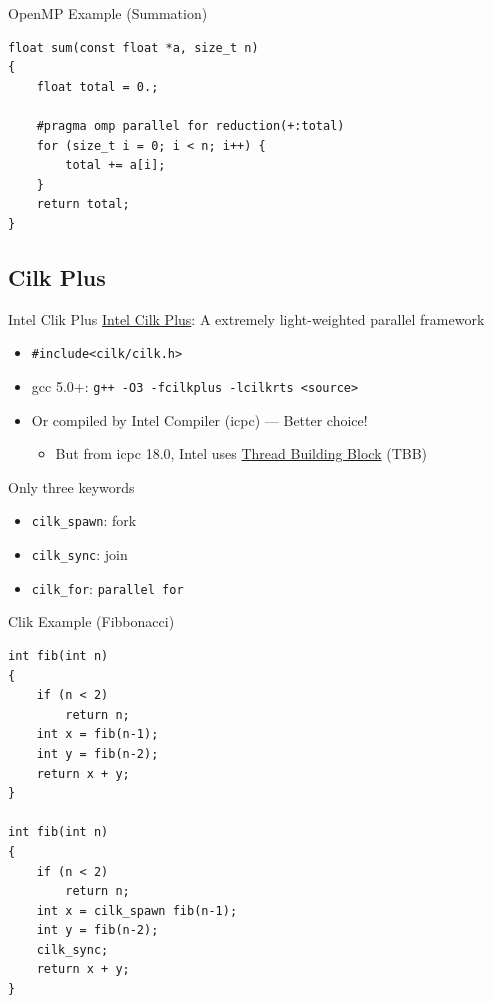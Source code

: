 \documentclass{../TexTemplate/myslide}
\begin{document}
\begin{frame}[fragile]{OpenMP Example (Summation)}
\begin{lstlisting}
float sum(const float *a, size_t n)
{
    float total = 0.;

    #pragma omp parallel for reduction(+:total)
    for (size_t i = 0; i < n; i++) {
        total += a[i];
    }
    return total;
}
\end{lstlisting}
\end{frame}

\subsection{Cilk Plus}
\begin{frame}
\subsectionpage
\end{frame}

\begin{frame}[fragile]{Intel Clik Plus}
\href{https://www.cilkplus.org/}{Intel Cilk Plus}: A extremely light-weighted parallel framework
\begin{itemize}
	\item \verb'#include<cilk/cilk.h>'
	\item gcc 5.0+: \verb'g++ -O3 -fcilkplus -lcilkrts <source>'
	\item Or compiled by Intel Compiler (icpc) --- Better choice!
	\begin{itemize}
		\item But from icpc 18.0, Intel uses \href{https://software.intel.com/en-us/articles/migrate-your-application-to-use-openmp-or-intelr-tbb-instead-of-intelr-cilktm-plus?_ga=2.174275746.1279103381.1550824040-508775473.1544510410}{Thread Building Block} (TBB)
	\end{itemize}
\end{itemize}
Only three keywords
\begin{itemize}
	\item \verb'cilk_spawn': fork
	\item \verb'cilk_sync': join
	\item \verb'cilk_for': \verb'parallel for'
\end{itemize}
\end{frame}

\begin{frame}[fragile]{Clik Example (Fibbonacci)}
\begin{lstlisting}
int fib(int n)
{
    if (n < 2)
        return n;
    int x = fib(n-1);
    int y = fib(n-2);
    return x + y;
}

int fib(int n)
{
    if (n < 2)
        return n;
    int x = cilk_spawn fib(n-1);
    int y = fib(n-2);
    cilk_sync;
    return x + y;
}
\end{lstlisting}
\end{frame}
\end{document}

